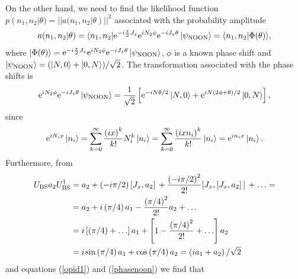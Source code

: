 On the other hand, we need to find the likelihood function $p(n_1, n_2| \theta) = ||a(n_1, n_2| \theta)||^2$ associated with the probability amplitude
\begin{equation}
a(n_1, n_2| \theta) = \langle n_1, n_2| \mathrm{e}^{-i\frac{\pi}{2}J_x}\mathrm{e}^{i N_2 \phi}\mathrm{e}^{-iJ_z\theta}\ket{\psi_{\mathrm{NOON}}} = \langle n_1, n_2| \Phi(\theta) \rangle,
\end{equation}
where $| \Phi(\theta) \rangle =  \mathrm{e}^{-i\frac{\pi}{2}J_x}\mathrm{e}^{i N_2 \phi}\mathrm{e}^{-iJ_z\theta}\ket{\psi_{\mathrm{NOON}}}$, $\phi$ is a known phase shift and $\ket{\psi_{\mathrm{NOON}}} = (\ket{N, 0} + \ket{0, N})/\sqrt{2}$. The transformation associated with the phase shifts is
\begin{equation}
\mathrm{e}^{i N_2 \phi}\mathrm{e}^{-iJ_z\theta}\ket{\psi_{\mathrm{NOON}}} = \frac{1}{\sqrt{2}}\left[\mathrm{e}^{-iN\theta/2}\ket{N, 0} + \mathrm{e}^{iN\left(2\phi + \theta\right)/2}\ket{0, N}\right],
\label{phasenoon}
\end{equation}
since
\begin{equation}
\mathrm{e}^{i N_i x}\ket{n_i} = \sum_{k=0}^\infty \frac{\left(i x\right)^k}{k!} N_i^k \ket{n_i} = \sum_{k=0}^\infty \frac{\left(i x n_i\right)^k}{k!}\ket{n_i} = \mathrm{e}^{i n_i x}\ket{n_i}.
\end{equation}
Furthermore, from
\begin{align}
U_{\mathrm{BS}} a_2 U_{\mathrm{BS}}^\dagger &= a_2 + \left( -i \pi/2 \right) \comm*{J_x}{a_2} + \frac{\left( -i \pi/2 \right)^2}{2!} \comm*{J_x}{\comm*{J_x}{a_2}} + \ldots = 
\nonumber \\ 
&= a_2 + i \left(\pi/4 \right) a_1 - \frac{\left(\pi/4 \right)^2}{2!} a_2 + \ldots
\nonumber \\
&= i\left[\left(\pi/4 \right) + \ldots \right]a_1 + \left[ 1 - \frac{\left(\pi/4 \right)^2}{2!} + \ldots \right]a_2
\nonumber \\
&= i\hspace{0.1em}\mathrm{sin}\left(\pi/4\right)a_1 + \mathrm{cos}\left(\pi/4\right)a_2 = \left(i a_1 + a_2\right)/\sqrt{2} 
\label{opid2}
\end{align}
and equations (\ref{opid1}) and (\ref{phasenoon}) we find that 
